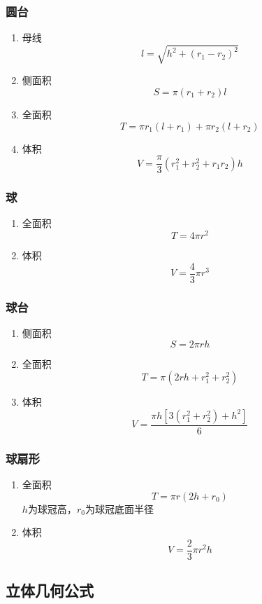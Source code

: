 \documentclass[a4paper]{article}
\begin{document}
\subsubsection{圆台}

\begin{enumerate}
	\item 母线
		$$l=\sqrt{h^2+(r_1-r_2)^2}$$
	\item 侧面积
		$$S=\pi(r_1+r_2)l$$
	\item 全面积
		$$T=\pi r_1(l+r_1)+\pi r_2(l+r_2)$$
	\item 体积
		$$V=\frac{\pi}{3}(r_1^2+r_2^2+r_1r_2)h$$
\end{enumerate}

\subsubsection{球}

\begin{enumerate}
	\item 全面积
		$$T=4\pi r^2$$
	\item 体积
		$$V=\frac{4}{3}\pi r^3$$
\end{enumerate}

\subsubsection{球台}

\begin{enumerate}
	\item 侧面积
		$$S=2\pi rh$$
	\item 全面积
		$$T=\pi(2rh+r_1^2+r_2^2)$$
	\item 体积
		$$V=\frac{\pi h[3(r_1^2+r_2^2)+h^2]}{6}$$
\end{enumerate}

\subsubsection{球扇形}

\begin{enumerate}
	\item 全面积
		$$T=\pi r(2h+r_0)$$
		$h$为球冠高，$r_0$为球冠底面半径
	\item 体积
		$$V=\frac{2}{3}\pi r^2h$$
\end{enumerate}

\subsection{立体几何公式}
\end{document}
